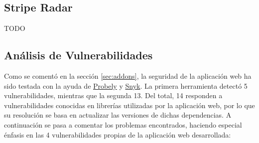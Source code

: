\documentclass[a4paper]{article}
\begin{document}
	\subsection{Stripe Radar} \label{sec:striperadar}
	TODO
	\subsection{Análisis de Vulnerabilidades} \label{sec:vulnerabilities}
	Como se comentó en la sección \ref{sec:addons}, la seguridad de la aplicación web ha sido testada con la ayuda de \href{https://probely.com/}{Probely} y \href{https://snyk.io/}{Snyk}. La primera herramienta detectó 5 vulnerabilidades, mientras que la segunda 13. Del total, 14 responden a vulnerabilidades conocidas en librerías utilizadas por la aplicación web, por lo que su resolución se basa en actualizar las versiones de dichas dependencias. A continuación se pasa a comentar los problemas encontrados, haciendo especial énfasis en las 4 vulnerabilidades propias de la aplicación web desarrollada: 
	
\end{document}
